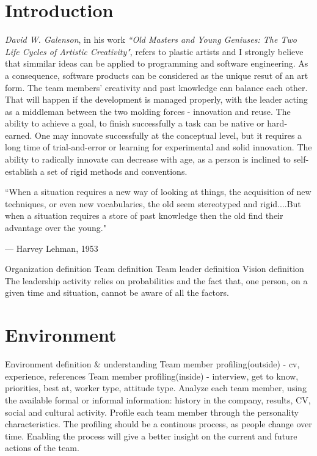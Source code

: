 \documentclass[conference]{IEEEtran}
\begin{document}
\section{Introduction}
\emph{David W. Galenson}, in his work \emph{``Old Masters and Young Geniuses: The Two Life Cycles of Artistic Creativity"}, refers to plastic artists and I strongly believe that simmilar ideas can be applied to programming and software engineering. As a consequence, software products can be considered as the unique resut of an art form. The team members' creativity and past knowledge can balance each other. That will happen if the development is managed properly, with the leader acting as a middleman between the two molding forces - innovation and reuse. 
\newline\indent
The ability to achieve a goal, to finish successfully a task can be native or hard-earned. One may innovate successfully at the conceptual level, but it requires a long time of trial-and-error or learning for experimental and solid innovation. The ability to radically innovate can decrease with age, as a person is inclined to self-establish a set of rigid methods and conventions.\cite{IEEEhowto:oldvsyoung}

\epigraph{``When a situation requires a new way of looking at things, the acquisition of new techniques, or even new vocabularies, the old seem stereotyped and rigid....But when a situation requires a store of past knowledge then the old find their advantage over the young."}{--- \textup{Harvey Lehman}, 1953
}
Organization definition
\newline\indent
Team definition
\newline\indent
Team leader definition
\newline\indent
Vision definition
\newline\indent
The leadership activity relies on probabilities and the fact that, one person, on a given time and situation, cannot be aware of all the factors. 

\section{Environment}
Environment definition \& understanding
\newline\indent
Team member profiling(outside) - cv, experience, references
\newline\indent
Team member profiling(inside) - interview, get to know, priorities, best at, worker type, attitude type. Analyze each team member, using the available formal or informal information: history in the company, results, CV, social and cultural activity. Profile each team member through the personality characteristics. The profiling should be a continous process, as people change over time. Enabling the process will give a better insight on the current and future actions of the team.
\newline\indent
\end{document}
